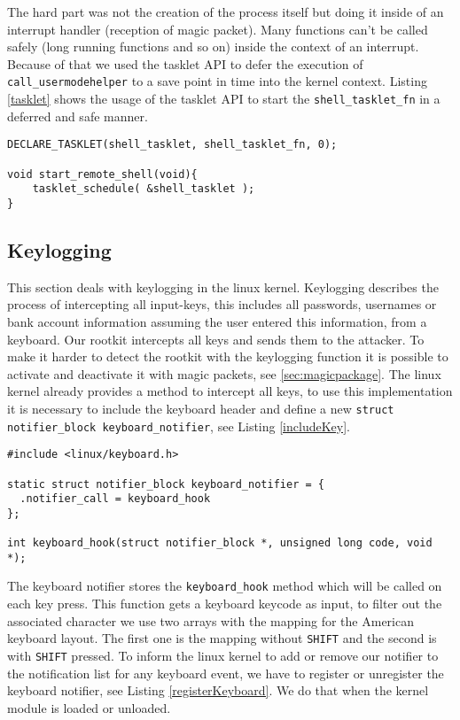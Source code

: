 \documentclass[12pt]{article}
\newcommand{\shellcmdinline}[1]{\texttt{\footnotesize #1}}
\begin{document}
The hard part was not the creation of the process itself but doing it inside of an interrupt handler (reception of magic packet). Many functions can't be called safely (long running functions and so on) inside the context of an interrupt. Because of that we used the tasklet API to defer the execution of \shellcmdinline{call\_usermodehelper} to a save point in time into the kernel context. Listing \ref{tasklet} shows the usage of the tasklet API to start the \shellcmdinline{shell\_tasklet\_fn} in a deferred and safe manner.

 \begin{lstlisting}[caption=Tasklet API., label=tasklet]
DECLARE_TASKLET(shell_tasklet, shell_tasklet_fn, 0);

void start_remote_shell(void){
	tasklet_schedule( &shell_tasklet );
}
 \end{lstlisting}



\subsection{Keylogging}
This section deals with keylogging in the linux kernel. Keylogging describes the process of intercepting all input-keys, this includes all passwords, usernames or bank account information assuming the user entered this information, from a keyboard. Our rootkit intercepts all keys and sends them to the attacker. To make it harder to detect the rootkit with the keylogging function it is possible to activate and deactivate it with magic packets, see \ref{sec:magicpackage}.  \newline
The linux kernel already provides a method to intercept all keys, to use this implementation it is necessary to include the keyboard header and define a new \lstinline{struct notifier_block keyboard_notifier}, see Listing \ref{includeKey}.

\begin{lstlisting}[caption=Keyboard header., label=includeKey]
#include <linux/keyboard.h>

static struct notifier_block keyboard_notifier = {
  .notifier_call = keyboard_hook
};

int keyboard_hook(struct notifier_block *, unsigned long code, void *);
\end{lstlisting}


The keyboard notifier stores the \lstinline{keyboard_hook} method which will be called on each key press. This function gets a keyboard keycode as input, to filter out the associated character we use two arrays with the mapping for the American keyboard layout. The first one is the mapping without \lstinline{SHIFT} and the second is with \lstinline{SHIFT} pressed.
To inform the linux kernel to add or remove our notifier to the notification list for any keyboard event, we have to register or unregister the keyboard notifier, see Listing \ref{registerKeyboard}. We do that when the kernel module is loaded or unloaded.
\end{document}

